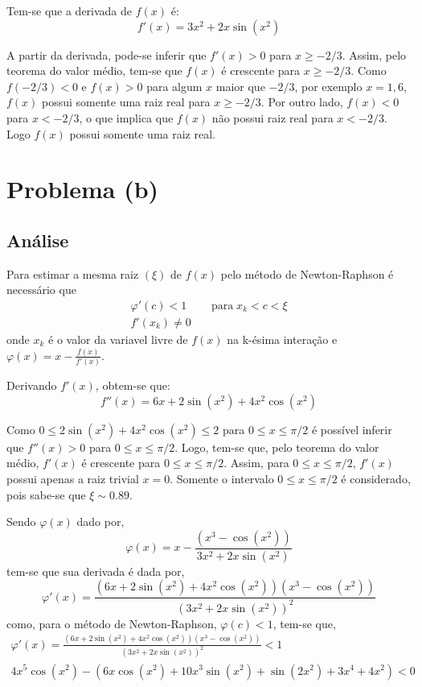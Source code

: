 \documentclass[a4paper,11pt, twoside]{article}
\begin{document}
	Tem-se que a derivada de $f(x)$ é:
	\begin{equation}
	    f'(x) = 3x^2 + 2x\sin(x^2)
	\end{equation}
	
    A partir da derivada, pode-se inferir que $f'(x)>0$ para $x\geq -2/3$.
    Assim, pelo teorema do valor médio, tem-se que $f(x)$ é crescente para $x\geq -2/3$.
    Como $f(-2/3)<0$ e  $f(x)>0$ para algum $x$ maior que $-2/3$, por exemplo $x=1,6$,
    $f(x)$ possui somente uma raiz real para $x\geq -2/3$.
    Por outro lado, $f(x)<0$ para $x<-2/3$, o que implica que $f(x)$ não possui raiz real para $x<-2/3$.
    Logo $f(x)$ possui somente uma raiz real.
    
    \section*{Problema (b)}
    \subsection*{Análise}
    Para estimar a mesma raiz $(\xi)$ de $f(x)$ pelo método de
    Newton-Raphson é necessário que
    \begin{eqnarray}
        \varphi'(c)<1 & \quad\mathrm{para}\;x_k<c<\xi\\
        f'(x_k)\neq 0
    \end{eqnarray}
    onde $x_k$ é
    o valor da variavel livre de $f(x)$ na k-ésima interação e \mbox{$\varphi(x) = x - \frac{f(x)}{f'(x)}$}.
    
    Derivando $f'(x)$, obtem-se que:
    \begin{equation}
        f''(x) = 6x + 2\sin(x^2) + 4x^2\cos(x^2)
    \end{equation}
    
    Como $0\le 2\sin(x^2) + 4x^2\cos(x^2)\le 2$ para $0 \le x \le \pi/2$ é possível inferir que
    $f''(x) > 0$ para $0 \le x \le \pi/2$.
    Logo, tem-se que, pelo teorema do valor médio,
    $f'(x)$ é crescente para $0 \le x \le \pi/2$. Assim, para $0 \le x \le \pi/2$, $f'(x)$ possui apenas a raiz trivial $x=0$.
    Somente o intervalo $0 \le x \le \pi/2$ é considerado, pois sabe-se que $\xi\sim0.89$.
    
    Sendo $\varphi(x)$ dado por,
    \begin{equation}
        \varphi(x) = x - \frac{(x^3 - \cos(x^2))}{3x^2 + 2x\sin(x^2)}
    \end{equation}
    tem-se que sua derivada é dada por,
    \begin{equation}
        \varphi'(x) = \frac{(6x + 2\sin(x^2) + 4x^2\cos(x^2))(x^3 - \cos(x^2))}{{(3x^2 + 2x\sin(x^2))}^2}
    \end{equation}
    como, para o método de Newton-Raphson, $\varphi(c)<1$, tem-se que,
    \begin{eqnarray}
        \varphi'(x) = \frac{(6x + 2\sin(x^2) + 4x^2\cos(x^2))(x^3 - \cos(x^2))}{{(3x^2 + 2x\sin(x^2))}^2} < 1\\
        4x^5\cos(x^2) - (6x\cos(x^2) + 10x^3\sin(x^2) + \sin(2x^2) + 3x^4 + 4x^2) < 0 \label{eq}
    \end{eqnarray}
    
\end{document}

